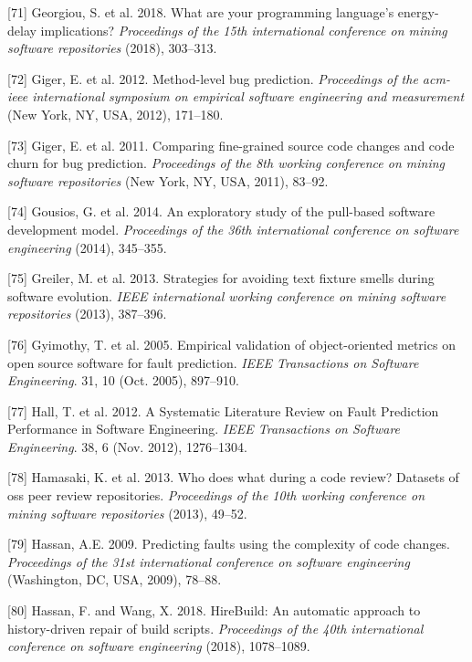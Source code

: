 \documentclass[]{book}
\begin{document}
\hypertarget{ref-GKLS2018}{}
{[}71{]} Georgiou, S. et al. 2018. What are your programming language's
energy-delay implications? \emph{Proceedings of the 15th international
conference on mining software repositories} (2018), 303--313.

\hypertarget{ref-giger2012}{}
{[}72{]} Giger, E. et al. 2012. Method-level bug prediction.
\emph{Proceedings of the acm-ieee international symposium on empirical
software engineering and measurement} (New York, NY, USA, 2012),
171--180.

\hypertarget{ref-Giger2011}{}
{[}73{]} Giger, E. et al. 2011. Comparing fine-grained source code
changes and code churn for bug prediction. \emph{Proceedings of the 8th
working conference on mining software repositories} (New York, NY, USA,
2011), 83--92.

\hypertarget{ref-gousios2014exploratory}{}
{[}74{]} Gousios, G. et al. 2014. An exploratory study of the pull-based
software development model. \emph{Proceedings of the 36th international
conference on software engineering} (2014), 345--355.

\hypertarget{ref-greiler2013}{}
{[}75{]} Greiler, M. et al. 2013. Strategies for avoiding text fixture
smells during software evolution. \emph{IEEE international working
conference on mining software repositories} (2013), 387--396.

\hypertarget{ref-Gyimothy2005}{}
{[}76{]} Gyimothy, T. et al. 2005. Empirical validation of
object-oriented metrics on open source software for fault prediction.
\emph{IEEE Transactions on Software Engineering}. 31, 10 (Oct. 2005),
897--910.

\hypertarget{ref-Hall2012}{}
{[}77{]} Hall, T. et al. 2012. A Systematic Literature Review on Fault
Prediction Performance in Software Engineering. \emph{IEEE Transactions
on Software Engineering}. 38, 6 (Nov. 2012), 1276--1304.

\hypertarget{ref-hamasaki2013does}{}
{[}78{]} Hamasaki, K. et al. 2013. Who does what during a code review?
Datasets of oss peer review repositories. \emph{Proceedings of the 10th
working conference on mining software repositories} (2013), 49--52.

\hypertarget{ref-hassan2009}{}
{[}79{]} Hassan, A.E. 2009. Predicting faults using the complexity of
code changes. \emph{Proceedings of the 31st international conference on
software engineering} (Washington, DC, USA, 2009), 78--88.

\hypertarget{ref-hassan2018hirebuild}{}
{[}80{]} Hassan, F. and Wang, X. 2018. HireBuild: An automatic approach
to history-driven repair of build scripts. \emph{Proceedings of the 40th
international conference on software engineering} (2018), 1078--1089.
\end{document}
